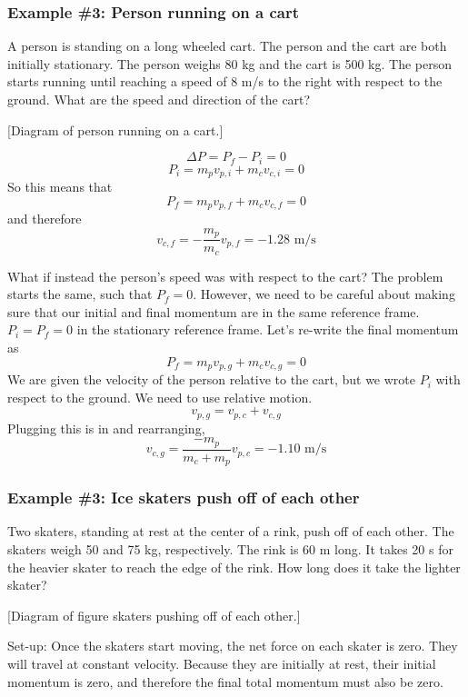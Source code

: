 \subsubsection*{Example \#3: Person running on a cart}
A person is standing on a long wheeled cart.  The person and the cart are both initially stationary. The person weighs 80 kg and the cart is 500 kg. The person starts running until reaching a speed of 8 m/s to the right with respect to the ground. What are the speed and direction of the cart?

[Diagram of person running on a cart.]\nopagebreak
\vspace{4cm}

$$\Delta P =P_f-P_i = 0$$
$$P_i=m_pv_{p,i}+m_cv_{c,i}=0$$
So this means that
$$P_f=m_pv_{p,f}+m_cv_{c,f}=0$$
and therefore
$$v_{c,f} = -\frac{m_p}{m_c}v_{p,f} = \boxed{-1.28\mbox{ m/s}}$$



What if instead the person's speed was with respect to the cart? The problem starts the same, such that $P_f=0$. However, we need to be careful about making sure that our initial and final momentum are in the same reference frame. $P_i=P_f=0$ in the stationary reference frame. Let's re-write the final momentum as
$$P_f=m_pv_{p,g}+m_cv_{c,g}=0$$
We are given the velocity of the person relative to the cart, but we wrote $P_i$ with respect to the ground. We need to use relative motion.
$$v_{p,g}=v_{p,c}+v_{c,g}$$
Plugging this is in and rearranging,
$$v_{c,g} = \frac{-m_p}{m_c+m_p}v_{p,c}=\boxed{-1.10\mbox{ m/s}}$$




\subsubsection*{Example \#3: Ice skaters push off of each other}
Two skaters, standing at rest at the center of a rink, push off of each other. The skaters weigh 50 and 75 kg, respectively. The rink is 60 m long. It takes 20 s for the heavier skater to reach the edge of the rink. How long does it take the lighter skater?

[Diagram of figure skaters pushing off of each other.]
\vspace{4cm}

Set-up: Once the skaters start moving, the net force on each skater is zero. They will travel at constant velocity. Because they are initially at rest, their initial momentum is zero, and therefore the final total momentum must also be zero.


